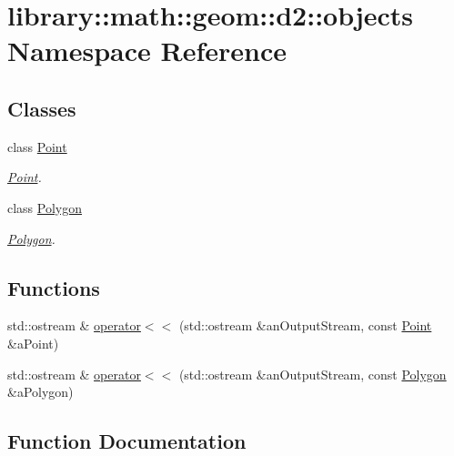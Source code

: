 \hypertarget{namespacelibrary_1_1math_1_1geom_1_1d2_1_1objects}{}\section{library\+:\+:math\+:\+:geom\+:\+:d2\+:\+:objects Namespace Reference}
\label{namespacelibrary_1_1math_1_1geom_1_1d2_1_1objects}
\subsection*{Classes}
\begin{DoxyCompactItemize}
\item 
class \hyperlink{classlibrary_1_1math_1_1geom_1_1d2_1_1objects_1_1_point}{Point}
\begin{DoxyCompactList}\small\item\em \hyperlink{classlibrary_1_1math_1_1geom_1_1d2_1_1objects_1_1_point}{Point}. \end{DoxyCompactList}\item 
class \hyperlink{classlibrary_1_1math_1_1geom_1_1d2_1_1objects_1_1_polygon}{Polygon}
\begin{DoxyCompactList}\small\item\em \hyperlink{classlibrary_1_1math_1_1geom_1_1d2_1_1objects_1_1_polygon}{Polygon}. \end{DoxyCompactList}\end{DoxyCompactItemize}
\subsection*{Functions}
\begin{DoxyCompactItemize}
\item 
std\+::ostream \& \hyperlink{namespacelibrary_1_1math_1_1geom_1_1d2_1_1objects_ae30b1eff05d5f215ad21e6849d8a2c69}{operator$<$$<$} (std\+::ostream \&an\+Output\+Stream, const \hyperlink{classlibrary_1_1math_1_1geom_1_1d2_1_1objects_1_1_point}{Point} \&a\+Point)
\item 
std\+::ostream \& \hyperlink{namespacelibrary_1_1math_1_1geom_1_1d2_1_1objects_a05ccd19c10d636afb7c5beab29e70e84}{operator$<$$<$} (std\+::ostream \&an\+Output\+Stream, const \hyperlink{classlibrary_1_1math_1_1geom_1_1d2_1_1objects_1_1_polygon}{Polygon} \&a\+Polygon)
\end{DoxyCompactItemize}


\subsection{Function Documentation}
\mbox{\label{namespacelibrary_1_1math_1_1geom_1_1d2_1_1objects_ae30b1eff05d5f215ad21e6849d8a2c69}} 
